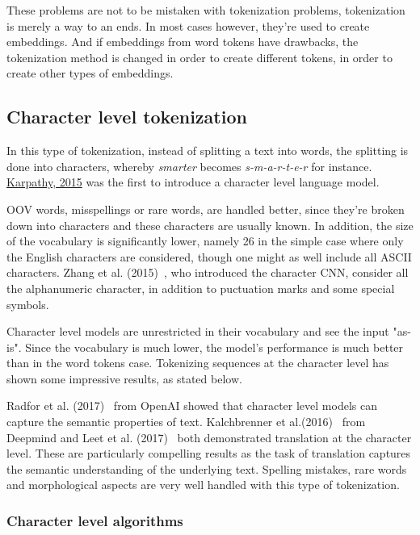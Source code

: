 These problems are not to be mistaken with tokenization problems, tokenization is merely a way to an ends. In most cases however, they're used to create embeddings. And if embeddings from word tokens have drawbacks, the tokenization method is changed in order to create different tokens, in order to create other types of embeddings.
    
\subsection{Character level tokenization}

In this type of tokenization, instead of splitting a text into words, the splitting is done into characters, whereby \emph{smarter} becomes \emph{s-m-a-r-t-e-r} for instance. \href{https://github.com/karpathy/char-rnn}{Karpathy, 2015} was the first to introduce a character level language model.

OOV words, misspellings or rare words, are handled better, since they're broken down into characters and these characters are usually known. In addition, the size of the vocabulary is significantly lower, namely 26 in the simple case where only the English characters are considered, though one might as well include all ASCII characters. Zhang et al. (2015)~\cite{zhang2015text}, who introduced the character CNN, consider all the alphanumeric character, in addition to puctuation marks and some special symbols.

Character level models are unrestricted in their vocabulary and see the input "as-is". Since the vocabulary is much lower, the model's performance is much better than in the word tokens case. Tokenizing sequences at the character level has shown some impressive results, as stated below.

Radfor et al. (2017)~\cite{radford2017learning} from OpenAI showed that character level models can capture the semantic properties of text. Kalchbrenner et al.(2016)~\cite{kalchbrenner2016neural} from Deepmind and Leet et al. (2017)~\cite{lee-etal-2017-fully} both demonstrated translation at the character level. These are particularly compelling results as the task of translation captures the semantic understanding of the underlying text. Spelling mistakes, rare words and morphological aspects are very well handled with this type of tokenization.

\subsubsection{Character level algorithms}

